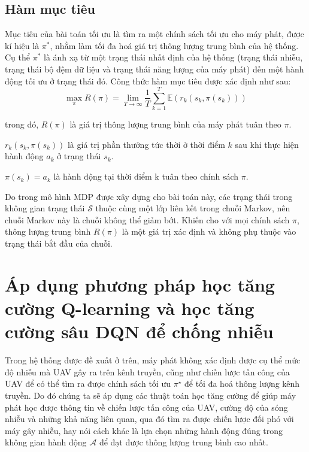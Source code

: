 \documentclass{uetgraduation}
\begin{document}
\subsection{Hàm mục tiêu}
Mục tiêu của bài toán tối ưu là tìm ra một chính sách tối ưu cho máy phát, được kí hiệu là $\pi^*$, nhằm làm tối đa hoá giá trị thông lượng trung bình
của hệ thống. Cụ thể $\pi^*$ là ánh xạ từ một trạng thái nhất định của hệ thống (trạng thái nhiễu, trạng thái bộ đệm dữ liệu và trạng thái năng
lượng của máy phát) đến một hành động tối ưu ở trạng thái đó.
Công thức hàm mục tiêu được xác định như sau:
\begin{equation}
    \max_{\pi} R(\pi) = \lim_{T \to \infty} \frac{1}{T} \sum_{k=1}^{T} \mathbb{E}\left( r_k(s_k, \pi(s_k)) \right)
\end{equation}

trong đó, $R(\pi)$ là giá trị thông lượng trung bình của máy phát tuân theo $\pi$.

$r_k(s_k, \pi(s_k))$ là giá trị phần thưởng tức thời ở thời điểm $k$ sau khi thực hiện hành động $a_k$ ở trạng thái $s_k$.

$\pi(s_k) = a_k$ là hành động tại thời điểm k tuân theo chính sách $\pi$.

Do trong mô hình MDP được xây dựng cho bài toán này, các trạng thái trong không gian trạng thái $\mathcal{S}$ thuộc cùng một lớp liên kết trong chuỗi Markov, nên chuỗi Markov này là chuỗi không thể giảm bớt.
Khiến cho với mọi chính sách $\pi$, thông lượng trung bình $R(\pi)$ là một giá trị xác định và không phụ thuộc vào trạng thái bắt đầu của chuỗi.

\section{Áp dụng phương pháp học tăng cường Q-learning và học tăng cường sâu DQN để chống nhiễu}
Trong hệ thống được đề xuất ở trên, máy phát không xác định được cụ thể mức độ nhiễu mà UAV gây ra trên kênh truyền, cũng như chiến lược tấn công của UAV để có thể tìm ra được
chính sách tối ưu $\pi^\star$ để tối đa hoá thông lượng kênh truyền. Do đó chúng ta sẽ áp dụng các thuật toán học tăng cường để giúp máy phát học được thông tin về chiến lược tấn công của UAV, cường độ 
của sóng nhiễu và những khả năng liên quan, qua đó tìm ra được chiến lược đối
phó với máy gây nhiễu, hay nói cách khác là lựa chọn những hành động đúng trong không gian hành động $\mathcal{A}$ để đạt được thông lượng trung bình cao nhất.
\end{document}
